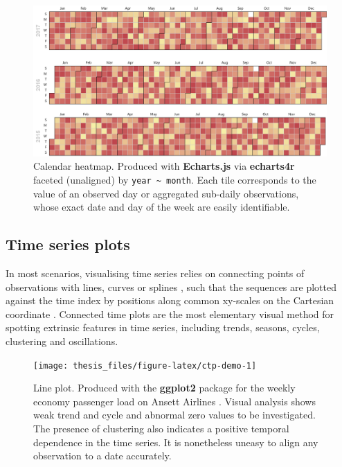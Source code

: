 \documentclass{aucklandthesis}
\begin{document}
\begin{figure}
\includegraphics[width=1\linewidth]{figures/cal-demo} \caption{Calendar heatmap. Produced with \textbf{Echarts.js} \autocite{echarts} via \textbf{echarts4r} \autocite{echarts4r} faceted (unaligned) by \texttt{year\ \textasciitilde{}\ month}. Each tile corresponds to the value of an observed day or aggregated sub-daily observations, whose exact date and day of the week are easily identifiable.}\label{fig:cal-demo}
\end{figure}



\hypertarget{time-series-plots}{%
\subsection{Time series plots}\label{time-series-plots}}

In most scenarios, visualising time series relies on connecting points of observations with lines, curves or splines \autocite{dataviz-ts}, such that the sequences are plotted against the time index by positions along common xy-scales on the Cartesian coordinate \autocite{fpp3}. Connected time plots are the most elementary visual method for spotting extrinsic features in time series, including trends, seasons, cycles, clustering and oscillations.

\begin{figure}
\texttt{[image: thesis\_files/figure-latex/ctp-demo-1]} \caption{Line plot. Produced with the \textbf{ggplot2} package \autocite{ggplot2} for the weekly economy passenger load on Ansett Airlines \autocite{fpp3d}. Visual analysis shows weak trend and cycle and abnormal zero values to be investigated. The presence of clustering also indicates a positive temporal dependence in the time series. It is nonetheless uneasy to align any observation to a date accurately.}\label{fig:ctp-demo}
\end{figure}
\end{document}
